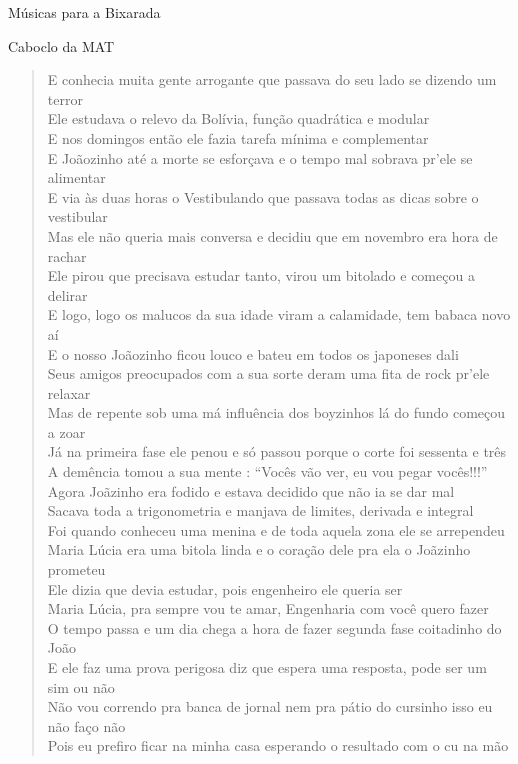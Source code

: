 \begin{secao}{Músicas para a Bixarada}
\begin{subsecao}{Caboclo da MAT}
\begin{verse}
{E conhecia muita gente arrogante que passava do seu lado se dizendo um terror\\
Ele estudava o relevo da Bolívia, função quadrática e modular\\
E nos domingos então ele fazia tarefa mínima e complementar\\
E Joãozinho até a morte se esforçava e o tempo mal sobrava pr'ele se alimentar\\
E via às duas horas o Vestibulando que passava todas as dicas sobre o vestibular\\
Mas ele não queria mais conversa e decidiu que em novembro era hora de rachar\\
Ele pirou que precisava estudar tanto, virou um bitolado e começou a delirar\\
E logo, logo os malucos da sua idade viram a calamidade, tem babaca novo aí\\
E o nosso Joãozinho ficou louco e bateu em todos os japoneses dali\\
Seus amigos preocupados com a sua sorte deram uma fita de rock pr'ele relaxar\\
Mas de repente sob uma má influência dos boyzinhos lá do fundo começou a zoar\\
Já na primeira fase ele penou e só passou porque o corte foi sessenta e três\\
A demência tomou a sua mente : ``Vocês vão ver, eu vou pegar vocês!!!''\\
Agora Joãzinho era fodido e estava decidido que não ia se dar mal\\
Sacava toda a trigonometria e manjava de limites, derivada e integral\\
Foi quando conheceu uma menina e de toda aquela zona ele se arrependeu\\
Maria Lúcia era uma bitola linda e o coração dele pra ela o Joãzinho prometeu\\
Ele dizia que devia estudar, pois engenheiro ele queria ser\\
Maria Lúcia, pra sempre vou te amar, Engenharia com você quero fazer\\
O tempo passa e um dia chega a hora de fazer segunda fase coitadinho do João\\
E ele faz uma prova perigosa diz que espera uma resposta, pode ser um sim ou não\\
Não vou correndo pra banca de jornal nem pra pátio do cursinho isso eu não faço
não\\
Pois eu prefiro ficar na minha casa esperando o resultado com o cu na mão\\
}
\end{verse}
\end{subsecao}
\end{secao}
